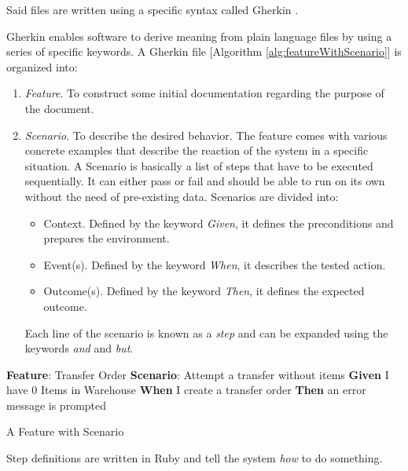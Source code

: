 Said files are written using a specific syntax called Gherkin \cite[p.~25]{Cucumber}.

Gherkin enables software to derive meaning from plain language files by using a series of specific keywords. A Gherkin file [Algorithm \ref{alg:featureWithScenario}] is organized into:

\begin{enumerate}
  \item \textit{Feature}. To construct some initial documentation regarding the purpose of the document.
  \item \textit{Scenario}. To describe the desired behavior. The feature comes with various concrete examples that describe the reaction of the system in a specific situation. A Scenario is basically a list of steps that have to be executed sequentially. It can either pass or fail and should be able to run on its own without the need of pre-existing data. Scenarios are divided into:
  \begin{itemize}
    \item Context. Defined by the keyword \textit{Given}, it defines the preconditions and prepares the environment.
    \item Event(s). Defined by the keyword \textit{When}, it describes the tested action.
    \item Outcome(s). Defined by the keyword \textit{Then}, it defines the expected outcome.
  \end{itemize}
  
  Each line of the scenario is known as a \textit{step} and can be expanded using the keywords \textit{and} and \textit{but}.
\end{enumerate}

\begin{algorithm}[H]
\SetAlgoLined
\textbf{Feature}: Transfer Order\;
    \hspace{5mm} \textbf{Scenario}: Attempt a transfer without items\;
        \hspace{10mm} \textbf{Given} I have 0 Items in Warehouse\;
        \hspace{10mm} \textbf{When} I create a transfer order\;
        \hspace{10mm} \textbf{Then} an error message is prompted\;
\caption{A Feature with Scenario}
\label{alg:featureWithScenario}
\end{algorithm}


Step definitions are written in Ruby and tell the system \textit{how} to do something.

